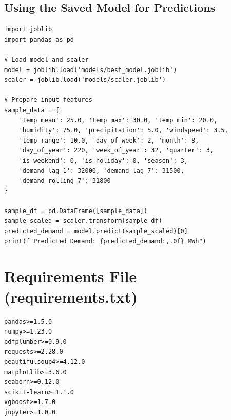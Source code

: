 \subsection*{Using the Saved Model for Predictions}
\begin{verbatim}
import joblib
import pandas as pd

# Load model and scaler
model = joblib.load('models/best_model.joblib')
scaler = joblib.load('models/scaler.joblib')

# Prepare input features
sample_data = {
    'temp_mean': 25.0, 'temp_max': 30.0, 'temp_min': 20.0,
    'humidity': 75.0, 'precipitation': 5.0, 'windspeed': 3.5,
    'temp_range': 10.0, 'day_of_week': 2, 'month': 8,
    'day_of_year': 220, 'week_of_year': 32, 'quarter': 3,
    'is_weekend': 0, 'is_holiday': 0, 'season': 3,
    'demand_lag_1': 32000, 'demand_lag_7': 31500,
    'demand_rolling_7': 31800
}

sample_df = pd.DataFrame([sample_data])
sample_scaled = scaler.transform(sample_df)
predicted_demand = model.predict(sample_scaled)[0]
print(f"Predicted Demand: {predicted_demand:,.0f} MWh")
\end{verbatim}

\section{Requirements File (requirements.txt)}
\begin{verbatim}
pandas>=1.5.0
numpy>=1.23.0
pdfplumber>=0.9.0
requests>=2.28.0
beautifulsoup4>=4.12.0
matplotlib>=3.6.0
seaborn>=0.12.0
scikit-learn>=1.1.0
xgboost>=1.7.0
jupyter>=1.0.0
\end{verbatim}